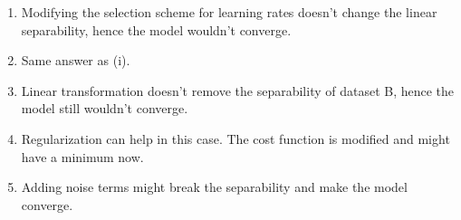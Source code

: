 \begin{answer}
	\begin{enumerate}
	\item Modifying the selection scheme for learning rates doesn't change the 
	linear separability, hence the model wouldn't converge.
	\item Same answer as (i).
	\item Linear transformation doesn't remove the separability of dataset B, hence 
	the model still wouldn't converge.
	\item Regularization can help in this case. The cost function is modified and 
	might have a minimum now.
	\item Adding noise terms might break the separability and make the model converge. \\ 
	\end{enumerate}
\end{answer}
